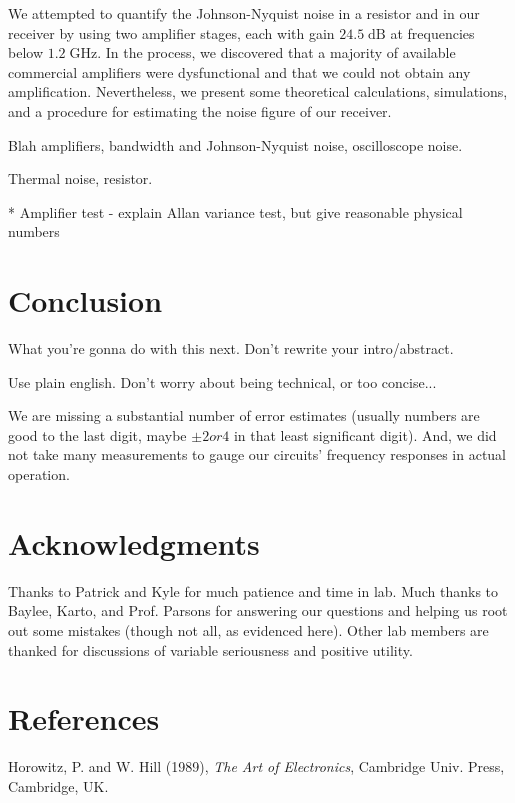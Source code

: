 \documentclass[11pt]{article}
\newcommand {\mt}{\mathrm}
\newcommand {\unit}[1]{\; \mt{#1}}
\begin{document}
We attempted to quantify the Johnson-Nyquist noise in a resistor and in our
receiver by using two amplifier stages, each with gain $24.5 \unit{dB}$ at
frequencies below $1.2 \unit{GHz}$.  In the process, we discovered that a
majority of available commercial amplifiers were dysfunctional and that we
could not obtain any amplification.  Nevertheless, we present some theoretical
calculations, simulations, and a procedure for estimating the noise figure of
our receiver.



Blah amplifiers, bandwidth and Johnson-Nyquist noise, oscilloscope noise.

Thermal noise, resistor.


* Amplifier test - explain Allan variance test, but give reasonable physical numbers

\section{Conclusion}

What you're gonna do with this next.  Don't rewrite your intro/abstract.

Use plain english.  Don't worry about being technical, or too concise...

We are missing a substantial number of error estimates (usually numbers are
good to the last digit, maybe $\pm 2 or 4$ in that least significant digit).
And, we did not take many measurements to gauge our circuits' frequency
responses in actual operation.

\section{Acknowledgments}

Thanks to Patrick and Kyle for much patience and time in lab.  Much thanks to
Baylee, Karto, and Prof. Parsons for answering our questions and helping us
root out some mistakes (though not all, as evidenced here).  Other lab members
are thanked for discussions of variable seriousness and positive utility.

\section{References}

\hangindent 0.25in Horowitz, P. and W. Hill (1989), \emph{The Art of
Electronics}, Cambridge Univ. Press, Cambridge, UK.
\end{document}
